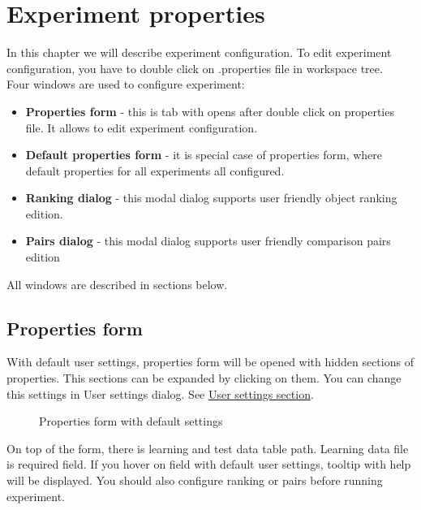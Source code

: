 \section{Experiment properties}\label{section:properties}

In this chapter we will describe experiment configuration. To edit experiment configuration, you have to double click on .properties file in workspace tree.\\

Four windows are used to configure experiment:
\begin{itemize}
	\item \textbf{Properties form} - this is tab with opens after double click on properties file. It allows to edit experiment configuration.
	\item \textbf{Default properties form} - it is special case of properties form, where default properties for all experiments all configured.
	\item \textbf{Ranking dialog} - this modal dialog supports user friendly object ranking edition.
	\item \textbf{Pairs dialog} - this modal dialog supports user friendly comparison pairs edition
\end{itemize}

All windows are described in sections below.

\subsection{Properties form}\label{sub:properties-form}

With default user settings, properties form will be opened with hidden sections of properties. This sections can be expanded by clicking on them. You can change this settings in User settings dialog. See \hyperref[section:user-settings]{User settings section}.

\begin{figure*}[!ht] 
	\centering
	\caption{Properties form with default settings}
\end{figure*}

On top of the form, there is learning and test data table path. Learning data file is required field. If you hover on field with default user settings, tooltip with help will be displayed. You should also configure ranking or pairs before running experiment.

